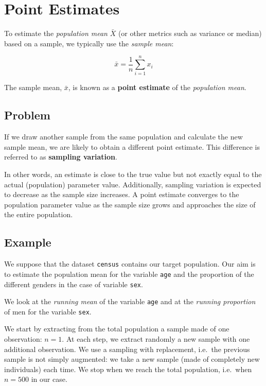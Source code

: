 \documentclass[
  letterpaper,
  DIV=11,
  numbers=noendperiod]{scrreprt}
\begin{document}
\section{Point Estimates}\label{point-estimates}

To estimate the \emph{population mean} \(\bar{X}\) (or other metrics
such as variance or median) based on a sample, we typically use the
\emph{sample mean}:

\[\bar{x} = \dfrac{1}{n} \sum_{i=1}^n x_i\]

The sample mean, \(\bar{x}\), is known as a \textbf{point estimate} of
the \emph{population mean}.

\subsection{Problem}\label{problem}

If we draw another sample from the same population and calculate the new
sample mean, we are likely to obtain a different point estimate. This
difference is referred to as \textbf{sampling variation}.

In other words, an estimate is close to the true value but not exactly
equal to the actual (population) parameter value. Additionally, sampling
variation is expected to decrease as the sample size increases. A point
estimate converges to the population parameter value as the sample size
grows and approaches the size of the entire population.

\subsection{Example}\label{example}

We suppose that the dataset \texttt{census} contains our target
population. Our aim is to estimate the population mean for the variable
\texttt{age} and the proportion of the different genders in the case of
variable \texttt{sex}.

We look at the \emph{running mean} of the variable \texttt{age} and at
the \emph{running proportion} of men for the variable \texttt{sex}.

We start by extracting from the total population a sample made of one
observation: \(n = 1\). At each step, we extract randomly a new sample
with one additional observation. We use a sampling with replacement,
i.e.~the previous sample is not simply augmented: we take a new sample
(made of completely new individuals) each time. We stop when we reach
the total population, i.e.~when \(n = 500\) in our case.
\end{document}
